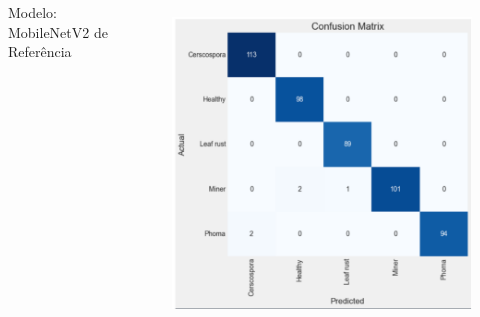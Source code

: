 \documentclass[aspectratio=169]{beamer}
\begin{document}
\begin{frame}
\begin{columns}
        \centering
        \tiny Modelo: MobileNetV2 de Referência
        \begin{figure}
            \centering
            \includegraphics[scale=0.35]{img/mobilenetreferencia.png}
            \label{fig:enter-label}
        \end{figure}



    \end{columns}
\end{frame}




\end{document}
